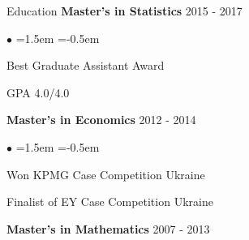 \documentclass{resume} %
\begin{document}
\begin{rSection}{Education}
            {\textbf{Master's in Statistics}} \hfill {2015 - 2017}
        \\ %
        {}
                    \begin{list}{$\bullet$}{ %
                \leftmargin=1.5em
                \itemsep=-0.5em
                \vspace{-0.5em}
            }
                            \item Best Graduate Assistant Award
                            \item GPA 4.0/4.0
                        \end{list}
                \vspace{0.1em}
            {\textbf{Master's in Economics}} \hfill {2012 - 2014}
        \\ %
        {}
                    \begin{list}{$\bullet$}{ %
                \leftmargin=1.5em
                \itemsep=-0.5em
                \vspace{-0.5em}
            }
                            \item Won KPMG Case Competition Ukraine
                            \item Finalist of EY Case Competition Ukraine
                        \end{list}
                \vspace{0.1em}
            {\textbf{Master's in Mathematics}} \hfill {2007 - 2013}
        \\ %
        {}
                \vspace{0.1em}
    \end{rSection}
\end{document}
